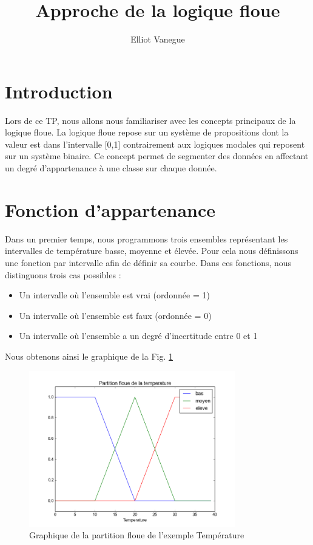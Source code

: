 \documentclass[a4paper,11pt]{article}
\title{Approche de la logique floue}
\author{Elliot Vanegue}
\begin{document}
\maketitle

\section{Introduction}
Lors de ce TP, nous allons nous familiariser avec les concepts principaux de la logique floue.
La logique floue repose sur un système de propositions dont la valeur est dans l'intervalle [0,1] contrairement aux logiques modales qui reposent sur un système binaire. Ce concept permet de segmenter des données en affectant un degré d'appartenance à une classe 
sur chaque donnée.

\section{Fonction d'appartenance}
Dans un premier temps, nous programmons trois ensembles représentant les intervalles de température basse, moyenne et élevée.
Pour cela nous définissons une fonction par intervalle afin de définir sa courbe. Dans ces fonctions, nous 
distinguons trois cas possibles :
\begin{itemize}
  \item Un intervalle où l'ensemble est vrai (ordonnée = 1)
  \item Un intervalle où l'ensemble est faux (ordonnée = 0)
  \item Un intervalle où l'ensemble a un degré d'incertitude entre 0 et 1
\end{itemize}
Nous obtenons ainsi le graphique de la Fig. \ref{fig:GraphiqueFlou} 

\begin{figure}[!h]
  \begin{center}
    \includegraphics[width=9cm]{tempFlou.png}
    \caption{Graphique de la partition floue de l'exemple \og Température \fg}
    \label{fig:GraphiqueFlou}
  \end{center}
\end{figure}
\end{document}
